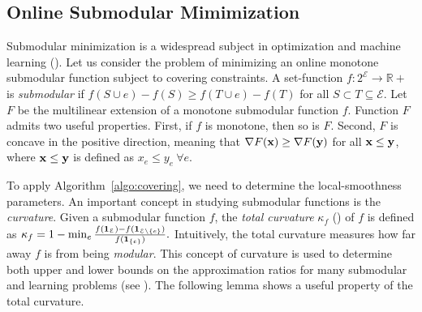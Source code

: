 
\subsection{Online Submodular Mimimization}	\label{apix:sub-min}

Submodular minimization is a widespread subject in optimization and machine learning (\cite{IwataFleischer01:A-combinatorial-strongly,Bachothers13:Learning-with,Bach16:Submodular-functions:,BalkanskiSinger:2020}). Let us consider the problem of minimizing an online monotone submodular function subject to covering constraints.
A set-function $f: 2^{\mathcal{E}} \rightarrow \mathbb{R}+$ is \emph{submodular} if
$f(S \cup e) - f(S) \geq f(T \cup e) - f(T)$ for all $S \subset T \subseteq \mathcal{E}$.
Let $F$ be the multilinear extension of a monotone submodular function $f$. Function $F$
admits two useful properties. First, if $f$ is monotone, then so is $F$. Second, $F$ is concave in
the positive direction, meaning that $\nabla F(\mathbf{x}) \geq \nabla F(\mathbf{y})$ for all $\mathbf{x} \leq \mathbf{y}$, where $\mathbf{x} \leq \mathbf{y}$ is defined as $x_{e} \leq y_{e} ~\forall e$.

To apply Algorithm~\ref{algo:covering}, we need to determine the local-smoothness parameters.
An important concept in studying submodular functions is the \emph{curvature}. Given a submodular
function $f$, the \emph{total curvature} $\kappa_{f}$ (\cite{ConfortiCornuejols84:Submodular-set-functions}) of $f$ is defined as
$
\kappa_{f} = 1 - \min_{e} \frac{f(\mathbf{1}_{\mathcal{E}}) - f(\mathbf{1}_{\mathcal{E} \setminus \{e\}})}{f(\mathbf{1}_{\{e\}})}.
$
Intuitively, the total curvature measures how far away $f$ is from being \emph{modular}. This concept of
curvature is used to determine both upper and lower bounds on the approximation ratios
for many submodular and learning problems (see \cite{ConfortiCornuejols84:Submodular-set-functions,GoemansHarvey09:Approximating-submodular,BalcanHarvey12:Learning-Submodular,Vondrak10:Submodularity-and-Curvature:,IyerJegelka13:Curvature-and-optimal,SviridenkoVondrak17:Optimal-approximation}).
The following lemma shows a useful property of the total curvature.

